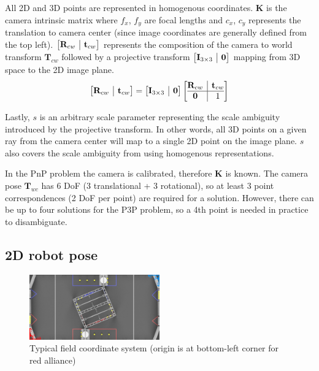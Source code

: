 \documentclass{article}
\makeatletter
\newcommand{\onebytwo}[2]{\ensuremath{\left[\begin{array}{@{}c|c@{}} #1 & #2 \end{array}\right]}}
\newcommand{\twobytwo}[4]{\ensuremath{\left[\begin{array}{@{}c|c@{}} #1 & #2 \\ \hline #3 & #4 \end{array}\right]}}
\makeatother
\begin{document}
All 2D and 3D points are represented in homogenous coordinates. $\mathbf{K}$ is the camera intrinsic matrix where $f_x$, $f_y$ are focal lengths and $c_x$, $c_y$ represents the translation to camera center (since image coordinates are generally defined from the top left). $\onebytwo{\mathbf{\mathbf{R}}_{cw}}{\mathbf{\mathbf{t}}_{cw}}$ represents the composition of the camera to world transform $\mathbf{\mathbf{T}}_{cw}$ followed by a projective transform $\onebytwo{\mathbf{\mathbf{I}}_{3 \times 3}}{\mathbf{\mathbf{0}}}$ mapping from 3D space to the 2D image plane.
\begin{align*}
    \onebytwo{\mathbf{R}_{cw}}{\mathbf{t}_{cw}} = \onebytwo{\mathbf{I}_{3 \times 3}}{\mathbf{0}} \twobytwo{\mathbf{R}_{cw}}{\mathbf{t}_{cw}}{\mathbf{0}}{1}
\end{align*}

Lastly, $s$ is an arbitrary scale parameter representing the scale ambiguity introduced by the projective transform. In other words, all 3D points on a given ray from the camera center will map to a single 2D point on the image plane. $s$ also covers the scale ambiguity from using homogenous representations.

In the PnP problem the camera is calibrated, therefore $\mathbf{K}$ is known. The camera pose $\mathbf{T}_{wc}$ has 6 DoF (3 translational + 3 rotational), so at least 3 point correspondences (2 DoF per point) are required for a solution. However, there can be up to four solutions for the P3P problem, so a 4th point is needed in practice to disambiguate. 

\subsection{2D robot pose}
\label{section:robot_pose}

\begin{figure}
    \centering
    \includegraphics[width=0.5\textwidth]{figures/infinite-recharge.jpeg}
    \caption{Typical field coordinate system (origin is at bottom-left corner for red alliance)~\cite{wpilib_geom}}
\end{figure}
\end{document}
